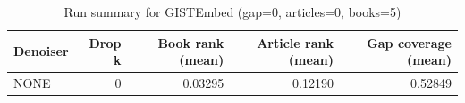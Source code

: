 \begin{table}
\caption{Run summary for GISTEmbed (gap=0, articles=0, books=5)}
\label{tab:summary_gap0_gistembed_a0_b5}
\begin{tabular}{lrrrr}
\toprule
Denoiser & Drop k & Book rank (mean) & Article rank (mean) & Gap coverage (mean) \\
\midrule
NONE & 0 & 0.03295 & 0.12190 & 0.52849 \\
\bottomrule
\end{tabular}
\end{table}